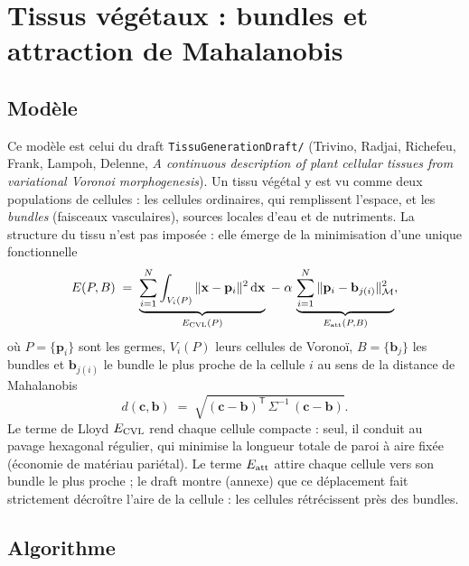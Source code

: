 \documentclass[11pt,a4paper]{article}
\newcommand{\code}[1]{\texttt{#1}}
\begin{document}
\section{Tissus végétaux : bundles et attraction de Mahalanobis}
\label{sec:tissue}

\subsection{Modèle}

Ce modèle est celui du draft \code{TissuGenerationDraft/} (Trivino, Radjai, Richefeu, Frank, Lampoh, Delenne,
\emph{A continuous description of plant cellular tissues from variational Voronoi morphogenesis}). Un tissu
végétal y est vu comme deux populations de cellules : les cellules ordinaires, qui remplissent l'espace, et les
\emph{bundles} (faisceaux vasculaires), sources locales d'eau et de nutriments. La structure du tissu n'est pas
imposée : elle émerge de la minimisation d'une unique fonctionnelle
\[
  E(P,B) \;=\; \underbrace{\sum_{i=1}^N \int_{V_i(P)} \|\mathbf x-\mathbf p_i\|^2\,\mathrm d\mathbf x}_{E_{\rm CVL}(P)}
  \;-\;\alpha\,\underbrace{\sum_{i=1}^N \|\mathbf p_i-\mathbf b_{j(i)}\|^2_{\mathcal M}}_{E_{\rm att}(P,B)},
\]
où $P=\{\mathbf p_i\}$ sont les germes, $V_i(P)$ leurs cellules de Voronoï, $B=\{\mathbf b_j\}$ les bundles et
$\mathbf b_{j(i)}$ le bundle le plus proche de la cellule $i$ au sens de la distance de Mahalanobis
\[
  d(\mathbf c,\mathbf b) \;=\; \sqrt{(\mathbf c-\mathbf b)^{\mathsf T}\,\Sigma^{-1}\,(\mathbf c-\mathbf b)} .
\]
Le terme de Lloyd $E_{\rm CVL}$ rend chaque cellule compacte : seul, il conduit au pavage hexagonal régulier, qui
minimise la longueur totale de paroi à aire fixée (économie de matériau pariétal). Le terme $E_{\rm att}$ attire
chaque cellule vers son bundle le plus proche ; le draft montre (annexe) que ce déplacement fait strictement
décroître l'aire de la cellule : les cellules rétrécissent près des bundles.

\subsection{Algorithme}
\end{document}
